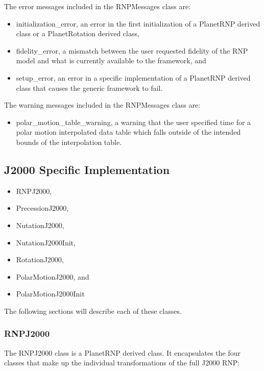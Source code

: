 The error messages included in the RNPMessages class are:

\begin{itemize}
\item{initialization\_error}, an error in the first initialization of a
PlanetRNP derived class or a PlanetRotation derived class,
\item{fidelity\_error}, a mismatch between the user requested fidelity of the
RNP model and what is currently available to the framework, and
\item{setup\_error}, an error in a specific implementation of a PlanetRNP
derived class that causes the generic framework to fail.
\end{itemize}

The warning messages included in the RNPMessages class are:

\begin{itemize}
\item{polar\_motion\_table\_warning}, a warning that the user specified
time for a polar motion interpolated data table which falls outside of the intended
bounds of the interpolation table.
\end{itemize}

\subsection{J2000 Specific Implementation}

\begin{itemize}
\item{RNPJ2000},
\item{PrecessionJ2000},
\item{NutationJ2000},
\item{NutationJ2000Init},
\item{RotationJ2000},
\item{PolarMotionJ2000}, and
\item{PolarMotionJ2000Init}
\end{itemize}

The following sections will describe each of these classes.

\subsubsection{RNPJ2000}

The RNPJ2000 class is a PlanetRNP derived class. It encapsulates the four
classes that make up the individual transformations of the full J2000 RNP:

